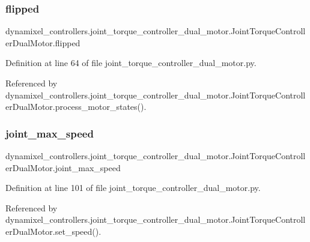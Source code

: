 \subsubsection{\texorpdfstring{flipped}{flipped}}
{\footnotesize\ttfamily dynamixel\+\_\+controllers.\+joint\+\_\+torque\+\_\+controller\+\_\+dual\+\_\+motor.\+Joint\+Torque\+Controller\+Dual\+Motor.\+flipped}



Definition at line 64 of file joint\+\_\+torque\+\_\+controller\+\_\+dual\+\_\+motor.\+py.



Referenced by dynamixel\+\_\+controllers.\+joint\+\_\+torque\+\_\+controller\+\_\+dual\+\_\+motor.\+Joint\+Torque\+Controller\+Dual\+Motor.\+process\+\_\+motor\+\_\+states().

\mbox{\label{classdynamixel__controllers_1_1joint__torque__controller__dual__motor_1_1_joint_torque_controller_dual_motor_a4d1512f434b86b646180e7c7c1796209}} 
\subsubsection{\texorpdfstring{joint\+\_\+max\+\_\+speed}{joint\_max\_speed}}
{\footnotesize\ttfamily dynamixel\+\_\+controllers.\+joint\+\_\+torque\+\_\+controller\+\_\+dual\+\_\+motor.\+Joint\+Torque\+Controller\+Dual\+Motor.\+joint\+\_\+max\+\_\+speed}



Definition at line 101 of file joint\+\_\+torque\+\_\+controller\+\_\+dual\+\_\+motor.\+py.



Referenced by dynamixel\+\_\+controllers.\+joint\+\_\+torque\+\_\+controller\+\_\+dual\+\_\+motor.\+Joint\+Torque\+Controller\+Dual\+Motor.\+set\+\_\+speed().

